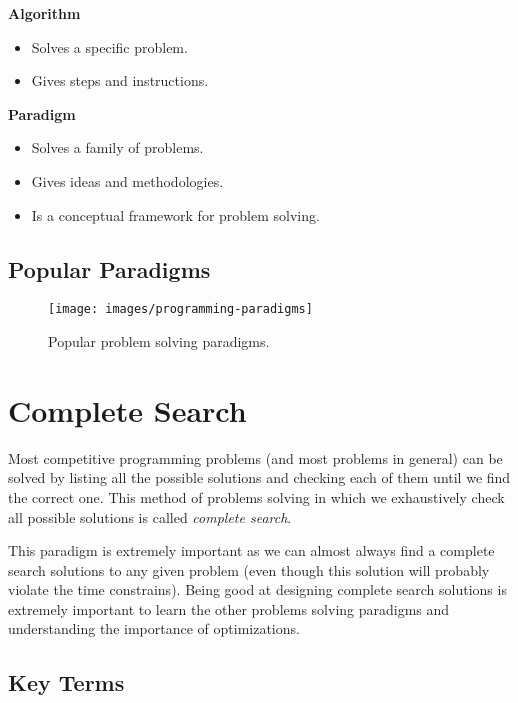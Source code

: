 \documentclass{article}
\begin{document}
\begin{multicols}{2}
	\raggedcolumns
	\centering \textbf{Algorithm}
	\begin{itemize}
		\item Solves a specific problem.
		\item Gives steps and instructions.
	\end{itemize}

	\columnbreak

	\centering \textbf{Paradigm}
	\begin{itemize}
		\item Solves a family of problems.
		\item Gives ideas and methodologies.
		\item Is a conceptual framework for problem solving.
	\end{itemize}
\end{multicols}

\subsection{Popular Paradigms}

\begin{figure}[H]
	\centering
	\texttt{[image: images/programming-paradigms]}
	\caption{Popular problem solving paradigms.}
\end{figure}

\section{Complete Search}

Most competitive programming problems (and most problems in general) can be solved by listing all the possible solutions and checking each of them until we find the correct one. This method of problems solving in which we exhaustively check all possible solutions is called \textit{complete search}.

This paradigm is extremely important as we can almost always find a complete search solutions to any given problem (even though this solution will probably violate the time constrains). Being good at designing complete search solutions is extremely important to learn the other problems solving paradigms and understanding the importance of optimizations.

\subsection{Key Terms} 
\end{document}
